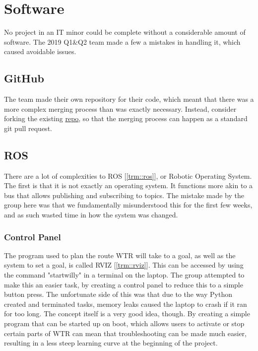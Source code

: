 \section{Software}
No project in an IT minor could be complete without a considerable amount of software.
The 2019 Q1\&Q2 team made a few a mistakes in handling it, which caused avoidable issues.

\subsection{GitHub}
The team made their own repository for their code, which meant that there was a more complex merging process than was exactly necessary.
Instead, consider forking the existing \href{https://github.com/Windesheim-Willy/}{repo}, so that the merging process can happen as a standard git pull request.

\subsection{ROS}
There are a lot of complexities to ROS [\ref{trm::ros}], or Robotic Operating System.
The first is that it is not exactly an operating system.
It functions more akin to a bus that allows publishing and subscribing to topics.
The mistake made by the group here was that we fundamentally misunderstood this for the first few weeks, and as such wasted time in how the system was changed.

\subsubsection{Control Panel}
The program used to plan the route WTR will take to a goal, as well as the system to set a goal, is called RVIZ [\ref{trm::rviz}].
This can be accessed by using the command "startwilly" in a terminal on the laptop.
The group attempted to make this an easier task, by creating a control panel to reduce this to a simple button press.
The unfortunate side of this was that due to the way Python created and terminated tasks, memory leaks caused the laptop to crash if it ran for too long.
The concept itself is a very good idea, though.
By creating a simple program that can be started up on boot, which allows users to activate or stop certain parts of WTR can mean that troubleshooting can be made much easier, resulting in a less steep learning curve at the beginning of the project.

